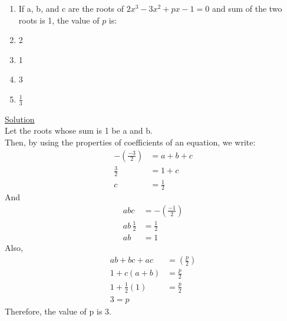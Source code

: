 \documentclass{article}
\begin{document}
    \hfill\begin{minipage}{\linewidth}
\begin{enumerate}
    \item[Q.11] If a, b, and c are the roots of $2x^3 - 3x^2 + px - 1=0$ and sum of the two roots is 1, the value of $p$ is: 
    \item[(A)] 2
    \item[(B)] 1
    \item[(C)] 3
    \item[(D)] $\frac{1}{3}$
\end{enumerate}
    \underline{Solution}\medskip\\
    Let the roots whose sum is 1 be a and b.\\
    Then, by using the properties of coefficients of an equation, we write:\medskip\\
    \begin{align*}
        -\left(\frac{-3}{2}\right)&=a+b+c\\
                               \frac{3}{2} &=1+c\\
                               c&=\frac{1}{2} \tag{1}
    \end{align*}
    And
    \begin{align*}
        abc&=-\left(\frac{-1}{2}\right)\\
        ab\,\frac{1}{2}&=\frac{1}{2}\tag{From (1)}\\ 
        ab&=1\tag{2}
    \end{align*}
    Also,
    \begin{align*}
        ab+bc+ac&=\left(\frac{p}{2}\right)\\
        1+c(a+b)&=\frac{p}{2}\tag{From (2)}\\
        1+\frac{1}{2}(1)&=\frac{p}{2}\tag{From (1)}\\
        3=p
    \end{align*}
    Therefore, the value of p is 3.
    
    
    \end{minipage}\bigskip
\end{document}
